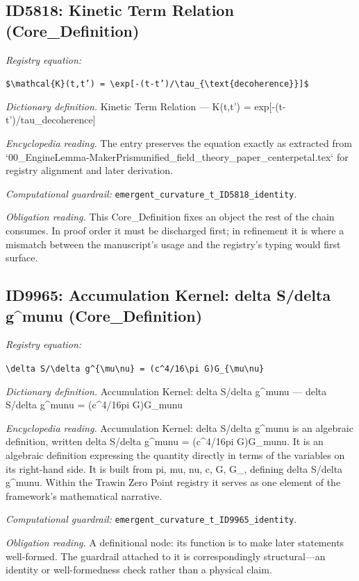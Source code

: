 \documentclass[11pt]{article}
\theoremstyle{remark}
\begin{document}
\subsection{ID5818: Kinetic Term Relation (Core\_Definition)}

\noindent\textit{Registry equation:}\par
{\small\texttt{\$\textbackslash{}mathcal\{K\}(t,t') = \textbackslash{}exp[-(t-t')/\textbackslash{}tau\_\{\textbackslash{}text\{decoherence\}\}]\$}}\par\medskip
\noindent\textit{Dictionary definition.} Kinetic Term Relation --- K(t,t') = exp[-(t-t')/tau\_decoherence]\par\medskip
\noindent\textit{Encyclopedia reading.} The entry preserves the equation exactly as extracted from `00\_EngineLemma-MakerPrismunified\_field\_theory\_paper\_centerpetal.tex` for registry alignment and later derivation.
\par\medskip\noindent\textit{Computational guardrail:} \texttt{emergent\_curvature\_t\_ID5818\_identity}.
\par\medskip\noindent\textit{Obligation reading.} This Core\_Definition fixes an object the rest of the chain consumes. In proof order it must be discharged first; in refinement it is where a mismatch between the manuscript's usage and the registry's typing would first surface.

\subsection{ID9965: Accumulation Kernel: delta S/delta g\textasciicircum{}munu (Core\_Definition)}

\noindent\textit{Registry equation:}\par
{\small\texttt{\textbackslash{}delta S/\textbackslash{}delta g\textasciicircum{}\{\textbackslash{}mu\textbackslash{}nu\} = (c\textasciicircum{}4/16\textbackslash{}pi G)G\_\{\textbackslash{}mu\textbackslash{}nu\}}}\par\medskip
\noindent\textit{Dictionary definition.} Accumulation Kernel: delta S/delta g\textasciicircum{}munu --- delta S/delta g\textasciicircum{}munu = (c\textasciicircum{}4/16pi G)G\_munu\par\medskip
\noindent\textit{Encyclopedia reading.} Accumulation Kernel: delta S/delta g\textasciicircum{}munu is an algebraic definition, written delta S/delta g\textasciicircum{}munu = (c\textasciicircum{}4/16pi G)G\_munu. It is an algebraic definition expressing the quantity directly in terms of the variables on its right-hand side. It is built from pi, mu, nu, c, G, G\_, defining delta S/delta g\textasciicircum{}munu. Within the Trawin Zero Point registry it serves as one element of the framework's mathematical narrative.
\par\medskip\noindent\textit{Computational guardrail:} \texttt{emergent\_curvature\_t\_ID9965\_identity}.
\par\medskip\noindent\textit{Obligation reading.} A definitional node: its function is to make later statements well-formed. The guardrail attached to it is correspondingly structural---an identity or well-formedness check rather than a physical claim.
\end{document}
